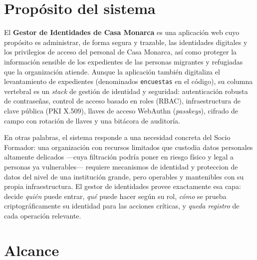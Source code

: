 \documentclass[10pt,letterpaper]{report}
\begin{document}
\section{Prop\'osito del sistema}
El \textbf{Gestor de Identidades de Casa Monarca} es una aplicaci\'on web cuyo prop\'osito es
administrar, de forma segura y trazable, las identidades digitales y los privilegios de acceso del
personal de Casa Monarca, as\'i como proteger la informaci\'on sensible de los expedientes de las
personas migrantes y refugiadas que la organizaci\'on atiende. Aunque la aplicaci\'on tambi\'en
digitaliza el levantamiento de expedientes (denominados \texttt{encuestas} en el c\'odigo), su
columna vertebral es un \emph{stack} de gesti\'on de identidad y seguridad: autenticaci\'on
robusta de contrase\~nas, control de acceso basado en roles (RBAC), infraestructura de clave
p\'ublica (PKI X.509), llaves de acceso WebAuthn (\emph{passkeys}), cifrado de campo con rotaci\'on
de llaves y una bit\'acora de auditor\'ia.

En otras palabras, el sistema responde a una necesidad concreta del Socio Formador: una
organizaci\'on con recursos limitados que custodia datos personales altamente delicados ---cuya
filtraci\'on podr\'ia poner en riesgo f\'isico y legal a personas ya vulnerables--- requiere
mecanismos de identidad y proteccion de datos del nivel de una instituci\'on grande, pero operables
y mantenibles con su propia infraestructura. El gestor de identidades provee exactamente esa capa:
decide \emph{qui\'en} puede entrar, \emph{qu\'e} puede hacer seg\'un su rol, \emph{c\'omo} se prueba
criptogr\'aficamente su identidad para las acciones cr\'iticas, y \emph{queda registro} de cada
operaci\'on relevante.

\section{Alcance}
\end{document}
